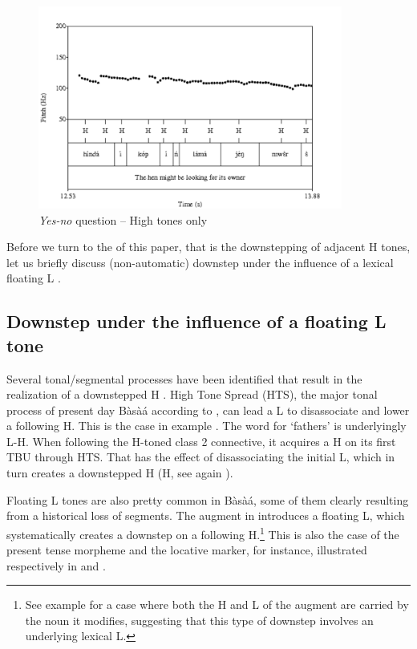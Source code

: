 \documentclass[output=paper,newtxmath,modfonts,nonflat,hidelinks]{langsci/langscibook}
\begin{document}
\begin{figure}
\centering
\includegraphics[width=10cm]{figures/HenManQNov}  
\caption{\emph{Yes-no} question -- High tones only \citep{MakassoEtAl17} \label{fig:HamlaouiMakasso:4}}
\end{figure}



\noindent Before we turn to the  of this paper, that is the downstepping of adjacent H tones, let us briefly discuss (non-automatic) downstep under the influence of a lexical floating L .

\subsection{Downstep under the influence of a floating L tone}

Several tonal/segmental processes have been identified that result in the realization of a downstepped H . High Tone Spread (HTS), the major tonal process of present day Bàsà{á} according to \citet{Hyman03}, can lead a L  to disassociate and lower a following H. This is the case in example . The word for `fathers' is underlyingly L-H. When following the H-toned class 2 connective, it acquires a H on its first TBU through HTS. That has the effect of disassociating the initial L, which in turn creates a downstepped H ({\textdownstep}H, see again ).


Floating L tones are also pretty common in Bàsà{á}, some of them clearly resulting from a historical loss of segments. The augment in  introduces a floating L, which systematically creates a downstep on a following H.\footnote{See example  for a case where both the H and L  of the augment are carried by the noun it modifies, suggesting that this type of downstep involves an underlying lexical L.}  This is also the case of the present tense morpheme and the locative marker, for instance, illustrated respectively in  and .
\end{document}
